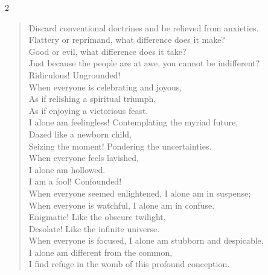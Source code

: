 \begin{paracol}{2}
\begin{verse}
Discard conventional doctrines and be relieved from anxieties.\\ Flattery or reprimand, what difference does it make?\\ Good or evil, what difference does it take?\\ Just because the people are at awe, you cannot be indifferent?\\ Ridiculous! Ungrounded!\\ When everyone is celebrating and joyous,\\ As if relishing a spiritual triumph,\\ As if enjoying a victorious feast.\\ I alone am feelingless! Contemplating the myriad future,\\ Dazed like a newborn child,\\ Seizing the moment! Pondering the uncertainties.\\ When everyone feels lavished,\\ I alone am hollowed.\\ I am a fool! Confounded!\\ When everyone seemed enlightened, I alone am in suspense;\\ When everyone is watchful, I alone am in confuse.\\ Enigmatic! Like the obscure twilight,\\ Desolate! Like the infinite universe.\\ When everyone is focused, I alone am stubborn and despicable.\\ I alone am different from the common,\\ I find refuge in the womb of this profound conception.
\end{verse}
\end{paracol}


